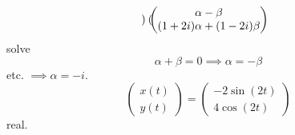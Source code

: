 \documentclass[10pt, a4paper]{article}
\begin{document}
\begin{problem}
\begin{solution}
\begin{enumerate}[label = (\alph*)]
\[\begin{pmatrix}
            \end{pmatrix} \\
            \begin{pmatrix}
                \alpha - \beta \\
                (1 + 2i)\alpha + (1 - 2i)\beta
            \end{pmatrix}
            \]
            solve
            \[
            \alpha + \beta = 0 \implies \alpha = -\beta
            \]
            etc.
            $\implies \alpha = -i$.
            \[
            \begin{pmatrix}
                x(t) \\ y(t)
            \end{pmatrix} = \begin{pmatrix}
                -2\sin(2t) \\
                4\cos(2t)
            \end{pmatrix}
            \]
            real.
        \end{enumerate}
    \end{solution}
\end{problem}
\end{document}
